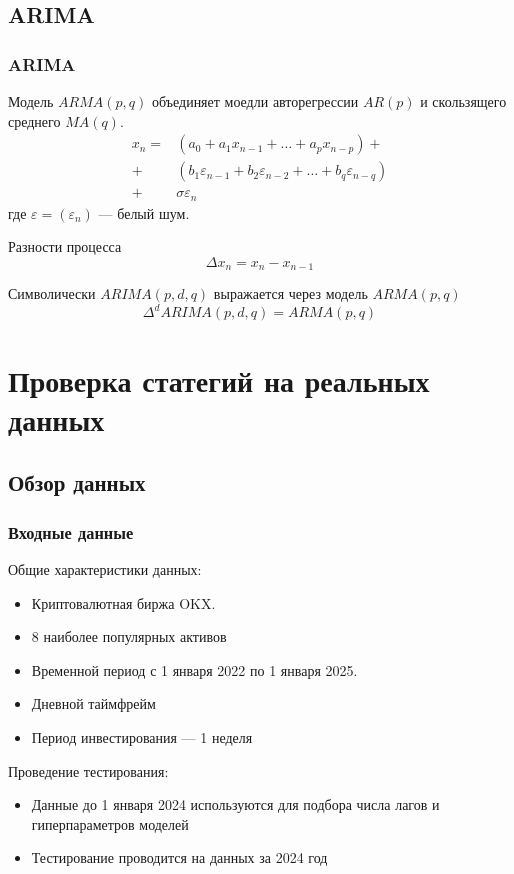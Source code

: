 \documentclass{beamer}
\renewcommand{\epsilon}{\varepsilon}
\begin{document}
\subsection{ARIMA}

\begin{frame}
    \frametitle{ARIMA}
    Модель $ARMA(p, q)$ объединяет моедли авторегрессии $AR(p)$ и скользящего среднего $MA(q)$.
    \begin{align*}
        x_n = & \left(a_0 + a_1 x_{n-1} + \dots + a_p x_{n-p} \right) + \\
	    + & \left(b_1 \epsilon_{n-1} + b_2 \epsilon_{n-2} + \dots + b_q \epsilon_{n - q} \right) \\
        + & \sigma \epsilon_n
    \end{align*}
    где $\epsilon = (\epsilon_n)$ --- белый шум.

    Разности процесса
    \[
        \Delta x_n = x_n - x_{n-1}
    \]

    Символически $ARIMA(p, d, q)$ выражается через модель $ARMA(p, q)$
    \[
        \Delta^d ARIMA(p, d, q) = ARMA(p, q)
    \]
\end{frame}

\section{Проверка статегий на реальных данных}

\subsection{Обзор данных}

\begin{frame}
    \frametitle{Входные данные}
    Общие характеристики данных:
    \begin{itemize}
        \item Криптовалютная биржа OKX. 
        \item 8 наиболее популярных активов
        \item Временной период с 1 января 2022 по 1 января 2025.
        \item Дневной таймфрейм
        \item Период инвестирования --- 1 неделя
    \end{itemize}

    Проведение тестирования:
    \begin{itemize}
        \item Данные до 1 января 2024 используются для подбора числа лагов и 
        гиперпараметров моделей
        \item Тестирование проводится на данных за 2024 год
    \end{itemize}
\end{frame}
\end{document}
